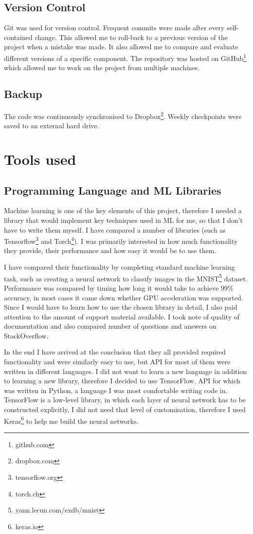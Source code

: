 \documentclass[12pt,a4paper]{book}
\begin{document}
\subsection{Version Control}
Git was used for version control.
Frequent commits were made after every self-contained change.
This allowed me to roll-back to a previous version of the project when a mistake was made.
It also allowed me to compare and evaluate different versions of a specific component.
The repository was hosted on GitHub\footnote{github.com} which allowed me to work on the project from multiple machines.
\subsection{Backup}
The code was continuously synchronised to Dropbox\footnote{dropbox.com}.
Weekly checkpoints were saved to an external hard drive.
\section{Tools used}
\subsection{Programming Language and ML Libraries}
Machine learning is one of the key elements of this project, therefore I needed a library that would implement key techniques used in ML for me, so that I don't have to write them myself.
I have compared a number of libraries (such as Tensorflow\footnote{tensorflow.org} and Torch\footnote{torch.ch}).
I was primarily interested in how much functionality they provide, their performance and how easy it would be to use them.

I have compared their functionality by completing standard machine learning task, such as creating a neural network to classify images in the MNIST\footnote{yann.lecun.com/exdb/mnist} dataset.
Performance was compared by timing how long it would take to achieve 99\% accuracy, in most cases it came down whether GPU acceleration was supported.
Since I would have to learn how to use the chosen library in detail, I also paid attention to the amount of support material available.
I took note of quality of documentation and also compared number of questions and answers on StackOverflow.

In the end I have arrived at the conclusion that they all provided required functionality and were similarly easy to use, but API for most of them were written in different languages.
I did not want to learn a new language in addition to learning a new library, therefore I decided to use TensorFlow, API for which was written in Python, a language I was most comfortable writing code in.
TensorFlow is a low-level library, in which each layer of neural network has to be constructed explicitly, I did not need that level of customisation, therefore I used Keras\footnote{keras.io} to help me build the neural networks.
\end{document}
